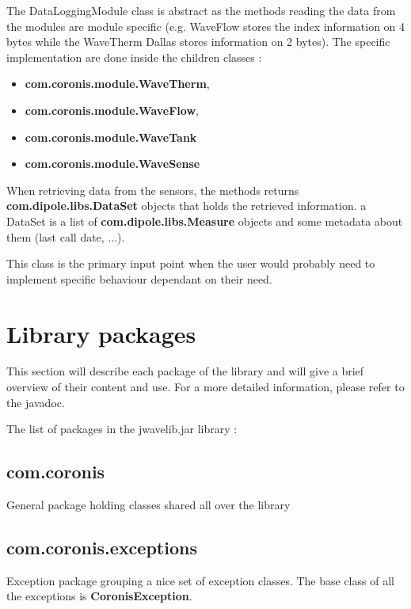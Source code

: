 \documentclass[a4paper,10pt,english]{sphinxmanual}
\begin{document}
The DataLoggingModule class is abstract as the methods reading the data from
the modules are module specific (e.g. WaveFlow stores the index information on
4 bytes while the WaveTherm Dallas stores information on 2 bytes). The specific
implementation are done inside the children classes :
\begin{itemize}
\item {} 
\textbf{com.coronis.module.WaveTherm},

\item {} 
\textbf{com.coronis.module.WaveFlow},

\item {} 
\textbf{com.coronis.module.WaveTank}

\item {} 
\textbf{com.coronis.module.WaveSense}

\end{itemize}

When retrieving data from the sensors, the methods returns
\textbf{com.dipole.libs.DataSet} objects that holds the retrieved information. a
DataSet is a list of \textbf{com.dipole.libs.Measure} objects and some metadata
about them (last call date, ...).

This class is the primary input point when the user would probably need to implement specific behaviour dependant on their need.


\section{Library packages}
\label{technical_overview:library-packages}
This section will describe each package of the library and will give a brief
overview of their content and use. For a more detailed information, please
refer to the javadoc.

The list of packages in the jwavelib.jar library :


\subsection{com.coronis}
\label{technical_overview:com-coronis}
General package holding classes shared all over the library


\subsection{com.coronis.exceptions}
\label{technical_overview:com-coronis-exceptions}
Exception package grouping a nice set of exception classes. The base class of all the exceptions is \textbf{CoronisException}.
\end{document}
